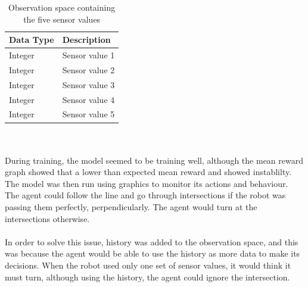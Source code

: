\documentclass[a4paper,12pt]{article}
\begin{document}
\begin{table}[H]
\centering
\caption{Observation space containing the five sensor values}
\label{tab:Observation space containing the five sensor values}
\begin{tabular}{|ll|}
\hline
\textbf{Data Type} & \textbf{Description}\\ \hline
Integer & Sensor value 1\\ 
Integer & Sensor value 2\\ 
Integer & Sensor value 3\\ 
Integer & Sensor value 4\\ 
Integer & Sensor value 5\\ \hline
\end{tabular}
\end{table}
\\\\
During training, the model seemed to be training well, although the mean reward graph showed that a lower than expected mean reward and showed instablilty. The model was then run using graphics to monitor its actions and behaviour. The agent could follow the line and go through intersections if the robot was passing them perfectly, perpendicularly. The agent would turn at the intersections otherwise. 
\\\\
In order to solve this issue, history was added to the observation space, and this was because the agent would be able to use the history as more data to make its decisions. When the robot used only one set of sensor values, it would think it must turn, although using the history, the agent could ignore the intersection. 
\end{document}
